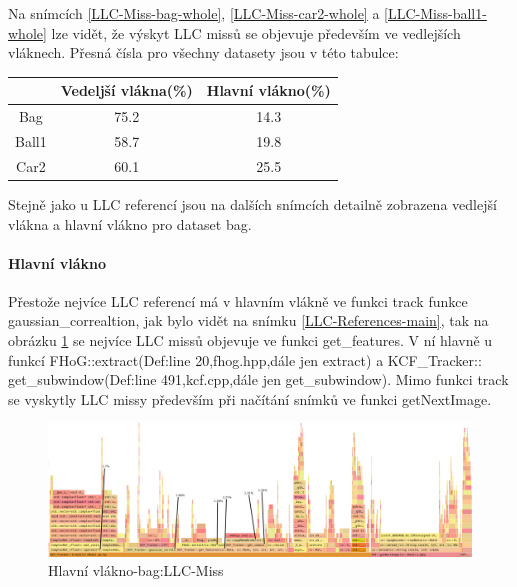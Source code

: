 \documentclass{article}
\begin{document}
Na snímcích \ref{LLC-Miss-bag-whole}, \ref{LLC-Miss-car2-whole} a \ref{LLC-Miss-ball1-whole} lze vidět, že výskyt LLC missů se objevuje především ve vedlejších vláknech. Přesná čísla pro všechny datasety jsou v této tabulce:
\begin{center}
	\begin{tabular}{|c|c|c|}
		\hline 
		& Vedeljší vlákna(\%) & Hlavní vlákno(\%) \\ 
		\hline 
		Bag & 75.2 & 14.3 \\ 
		\hline 
		Ball1 & 58.7 & 19.8 \\ 
		\hline 
		Car2 & 60.1 & 25.5 \\ 
		\hline
	\end{tabular}
\end{center}
Stejně jako u LLC referencí jsou na dalších snímcích detailně zobrazena vedlejší vlákna a hlavní vlákno pro dataset bag.
\newpage
\paragraph{Hlavní vlákno}
Přestože nejvíce LLC referencí má v hlavním vlákně ve funkci track funkce gaussian\_correaltion, jak bylo vidět na snímku \ref{LLC-References-main}, tak na obrázku \ref{LLC-Miss-main} se nejvíce LLC missů objevuje ve funkci get\_features. V ní hlavně u funkcí FHoG::extract(Def:line 20,fhog.hpp,dále jen extract) a KCF\_Tracker::
get\_subwindow(Def:line 491,kcf.cpp,dále jen get\_subwindow). Mimo funkci track se vyskytly LLC missy především při načítání snímků ve funkci getNextImage.
\begin{figure}[h!]
	\centering
	\includegraphics[width=\linewidth]{Perf/Bag/LLC-Miss-bag-closeup-main-gimp.png}
	\caption{Hlavní vlákno-bag:LLC-Miss}
	\label{LLC-Miss-main}
\end{figure}
\end{document}
